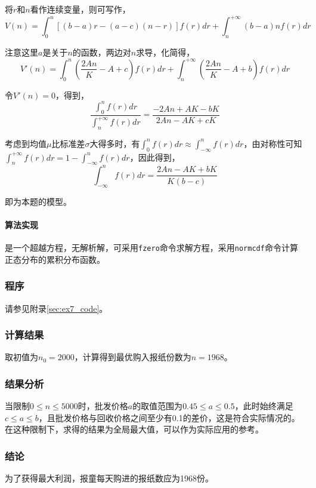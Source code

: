 将$r$和$n$看作连续变量，则可写作，
\begin{equation}
    V(n)=\int_0^n [(b-a) r-(a-c)(n-r)]f(r)dr + \int_n^{+\infty} (b-a)nf(r) dr
\end{equation}

注意这里$a$是关于$n$的函数，两边对$n$求导，化简得，
\begin{equation}
    V'(n) = \int_0^n \left(\frac{2An}{K}-A+c\right) f(r) dr + \int_n^{+\infty} \left(\frac{2An}{K}-A+b\right)f(r)dr
\end{equation}

令$V'(n)=0$，得到，
\begin{equation}
    \frac{\int_0^n f(r)dr}{\int_n^{+\infty} f(r)dr} = \frac{-2An+AK-bK}{2An-AK+cK}
\end{equation}

考虑到均值$\mu$比标准差$\sigma$大得多时，有$\int_0^n f(r)dr \approx \int_{-\infty}^n f(r)dr$，由对称性可知$\int_n^{+\infty} f(r)dr = 1-\int_{-\infty}^n f(r)dr$，因此得到，
\begin{equation}\label{eq:ex7_model}
    \int_{-\infty}^n f(r) dr = \frac{2An-AK+bK}{K(b-c)}
\end{equation}

即为本题的模型。

\paragraph{算法实现} 是一个超越方程，无解析解，可采用\texttt{fzero}命令求解方程，采用\texttt{normcdf}命令计算正态分布的累积分布函数。

\subsubsection{程序}

请参见附录\ref{sec:ex7_code}。

\subsubsection{计算结果}

取初值为$n_0=2000$，计算得到最优购入报纸份数为$n=1968$。

\subsubsection{结果分析}

当限制$0 \le n \le 5000$时，批发价格$a$的取值范围为$0.45 \le a \le 0.5$，此时始终满足$c \le a \le b$，且批发价格与回收价格之间至少有0.1的差价，这是符合实际情况的。在这种限制下，求得的结果为全局最大值，可以作为实际应用的参考。

\subsubsection{结论}

为了获得最大利润，报童每天购进的报纸数应为1968份。
